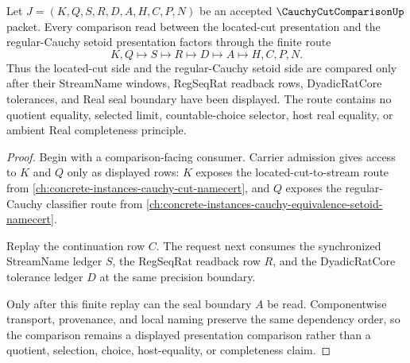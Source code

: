 \begin{theorem}
\label{thm:cauchy-cut-comparison-route}
Let $J=(K,Q,S,R,D,A,H,C,P,N)$ be an accepted $\CauchyCutComparisonUp$ packet. Every comparison read between the located-cut presentation and the regular-Cauchy setoid presentation factors through the finite route
$$
K,Q \longmapsto S \longmapsto R \longmapsto D \longmapsto A \longmapsto H,C,P,N .
$$
Thus the located-cut side and the regular-Cauchy setoid side are compared only after their StreamName windows, RegSeqRat readback rows, DyadicRatCore tolerances, and Real seal boundary have been displayed. The route contains no quotient equality, selected limit, countable-choice selector, host real equality, or ambient Real completeness principle.
\end{theorem}
\begin{proof}
Begin with a comparison-facing consumer. Carrier admission gives access to $K$ and $Q$ only as displayed rows: $K$ exposes the located-cut-to-stream route from \autoref{ch:concrete-instances-cauchy-cut-namecert}, and $Q$ exposes the regular-Cauchy classifier route from \autoref{ch:concrete-instances-cauchy-equivalence-setoid-namecert}.

Replay the continuation row $C$. The request next consumes the synchronized StreamName ledger $S$, the RegSeqRat readback row $R$, and the DyadicRatCore tolerance ledger $D$ at the same precision boundary.

Only after this finite replay can the seal boundary $A$ be read. Componentwise transport, provenance, and local naming preserve the same dependency order, so the comparison remains a displayed presentation comparison rather than a quotient, selection, choice, host-equality, or completeness claim.
\end{proof}




